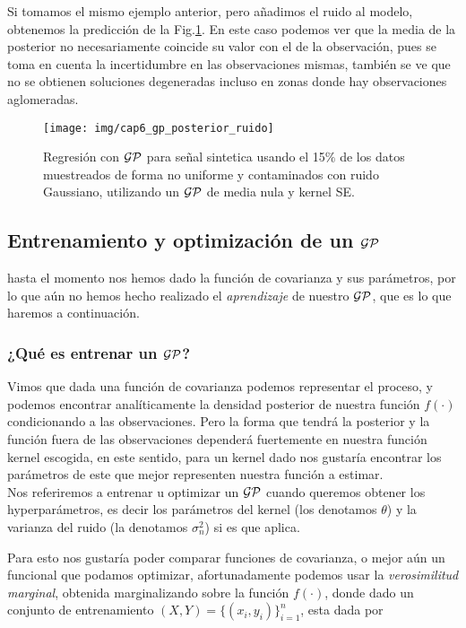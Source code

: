 Si tomamos el mismo ejemplo anterior, pero añadimos el ruido al modelo, obtenemos la predicción de la Fig.\ref{fig:gp_3}. En este caso podemos ver que la media de la posterior no necesariamente coincide su valor con el de la observación, pues se toma en cuenta la incertidumbre en las observaciones mismas, también se ve que no se obtienen soluciones degeneradas incluso en zonas donde hay observaciones aglomeradas.


\begin{figure}[H]
	\centering
	\texttt{[image: img/cap6\_gp\_posterior\_ruido]}
	\caption{Regresión con $\mathcal{GP}$ para señal sintetica usando el 15$\%$ de los datos muestreados de forma no uniforme y contaminados con ruido Gaussiano, utilizando un $\mathcal{GP}$ de media nula y kernel SE.}
	\label{fig:gp_3}
\end{figure}

\subsection{Entrenamiento y optimización de un $\mathcal{GP}$}

hasta el momento nos hemos dado la función de covarianza y sus parámetros, por lo que aún no hemos hecho realizado el \textit{aprendizaje} de nuestro $\mathcal{GP}$, que es lo que haremos a continuación.

\subsubsection{¿Qué es entrenar un $\mathcal{GP}$?}

Vimos que dada una función de covarianza podemos representar el proceso, y podemos encontrar analíticamente la densidad posterior de nuestra función $f(\cdot)$ condicionando a las observaciones. Pero la forma que tendrá la posterior y la función fuera de las observaciones dependerá fuertemente en nuestra función kernel escogida, en este sentido, para un kernel dado nos gustaría encontrar los parámetros de este que mejor representen nuestra función a estimar.\\

Nos referiremos a entrenar u optimizar un $\mathcal{GP}$ cuando queremos obtener los hyperparámetros, es decir los parámetros del kernel (los denotamos $\theta$) y la varianza del ruido (la denotamos $\sigma_n^2$) si es que aplica.

Para esto nos gustaría poder comparar funciones de covarianza, o mejor aún un funcional que podamos optimizar, afortunadamente podemos usar la \textit{verosimilitud marginal}, obtenida marginalizando sobre la función $f(\cdot)$, donde dado un conjunto de entrenamiento $(X, Y)= \{(x_i, y_i)\}_{i=1}^{n}$, esta dada por


